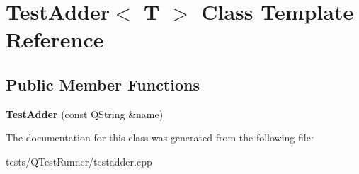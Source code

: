 \hypertarget{classTestAdder}{\section{Test\+Adder$<$ T $>$ Class Template Reference}
\label{classTestAdder}
}
\subsection*{Public Member Functions}
\begin{DoxyCompactItemize}
\item 
\hypertarget{classTestAdder_a64f9008ae27868e36acdd5c94eebae3b}{{\bfseries Test\+Adder} (const Q\+String \&name)}\label{classTestAdder_a64f9008ae27868e36acdd5c94eebae3b}

\end{DoxyCompactItemize}


The documentation for this class was generated from the following file\+:\begin{DoxyCompactItemize}
\item 
tests/\+Q\+Test\+Runner/testadder.\+cpp\end{DoxyCompactItemize}
